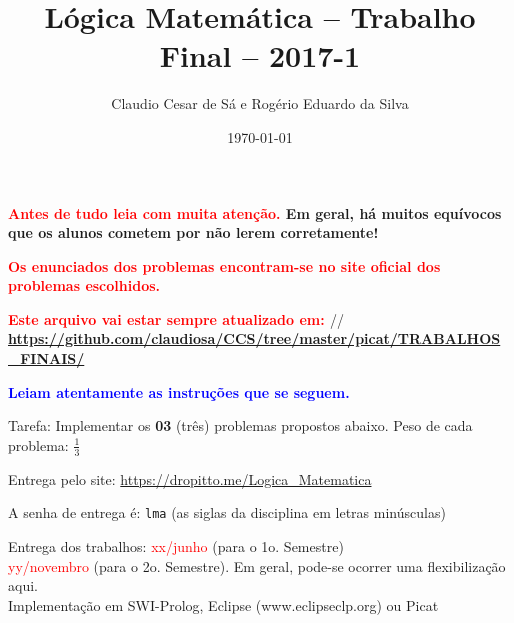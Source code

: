 \documentclass[a4paper,12pt]{article}
\title{Lógica Matemática -- Trabalho Final -- 2017-1}
\author{Claudio Cesar de Sá e Rogério Eduardo da Silva}
\date{\today}
\begin{document}
\maketitle

\begin{flushleft}


\vspace{0.5cm}
  {\bf \textcolor{red}{
Antes de tudo leia com \textbf{muita atenção}.} Em geral, há muitos equívocos
que os alunos cometem por não lerem corretamente!}

\vspace{0.5cm}
  {\bf \textcolor{red}{Os enunciados dos problemas encontram-se no site oficial dos problemas escolhidos.}}


\vspace{0.5cm}
  {\bf \textcolor{red}{Este arquivo vai estar sempre atualizado em: }}//
{\bf \textcolor{red}{\url{https://github.com/claudiosa/CCS/tree/master/picat/TRABALHOS_FINAIS/}}}



\vspace{0.5cm}
 {\bf \textcolor{blue}{Leiam atentamente as
instruções que se seguem.}}


\vspace{0.5cm}
 Tarefa: Implementar os  \textbf{03} (três)   problemas propostos abaixo. 
Peso de cada problema: $\frac{1}{3}$


\vspace{0.5cm}
 Entrega pelo site: \textcolor{red}{\url{https://dropitto.me/Logica_Matematica}}

\vspace{0.5cm}
 A senha de entrega  é: \texttt{lma} (as siglas da disciplina em letras minúsculas)

\vspace{0.5cm}
 Entrega dos trabalhos: \textcolor{red}{xx/junho} (para o 1o. Semestre)\\
\textcolor{red}{yy/novembro} (para o 2o. Semestre). Em geral, pode-se
ocorrer uma flexibilização aqui.\\



\vspace{0.5cm}
 Implementação em SWI-Prolog, Eclipse (www.eclipseclp.org) ou Picat\\


\end{flushleft}
\end{document}
